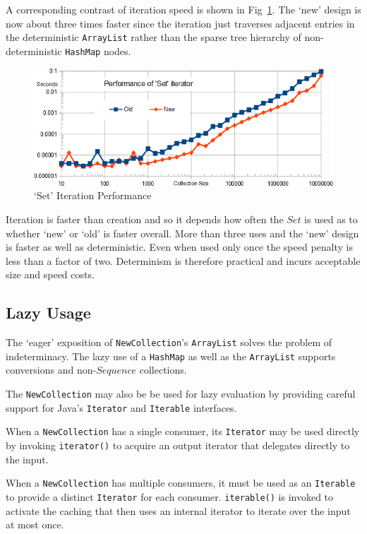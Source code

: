 \documentclass{llncs}
\begin{document}
A corresponding contrast of iteration speed is shown in Fig~\ref{fig:SetIteratePerformance}. The `new' design is now about three times faster since the iteration just traverses adjacent entries in the deterministic \verb$ArrayList$ rather than the sparse tree hierarchy of non-deterministic \verb$HashMap$ nodes.

\begin{figure}
	\begin{center}
		\includegraphics[width=4.5in]{SetIteratePerformance.png}
	\end{center}
	\caption{`Set' Iteration Performance}
	\label{fig:SetIteratePerformance}
\end{figure}

Iteration is faster than creation and so it depends how often the $Set$ is used as to whether `new' or `old' is faster overall. More than three uses and the `new' design is faster as well as deterministic. Even when used only once the speed penalty is less than a factor of two. Determinism is therefore practical and incurs acceptable size and speed costs. 

\subsection{Lazy Usage}

The `eager' exposition of \verb$NewCollection$'s \verb$ArrayList$ solves the problem of indeterminacy. The lazy use of a \verb$HashMap$ as well as the \verb$ArrayList$ supports conversions and non-$Sequence$ collections.

The \verb$NewCollection$ may also be be used for lazy evaluation by providing careful support for Java's \verb$Iterator$ and \verb$Iterable$ interfaces.

When a \verb$NewCollection$ has a single consumer, its \verb$Iterator$ may be used directly by invoking \verb$iterator()$ to acquire an output iterator that delegates directly to the input.

When a \verb$NewCollection$ has multiple consumers, it must be used as an \verb$Iterable$ to provide a distinct \verb$Iterator$ for each consumer. \verb$iterable()$ is invoked to activate the caching that then uses an internal iterator to iterate over the input at most once.
\end{document}
